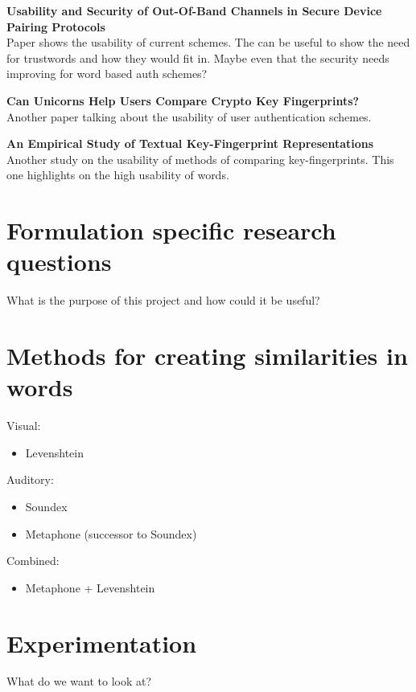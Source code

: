 \textbf{Usability and Security of Out-Of-Band Channels in Secure Device Pairing Protocols}\\
Paper shows the usability of current schemes. The can be useful to show the need for trustwords and how they would fit in. Maybe even that the security needs improving for word based auth schemes?

\textbf{Can Unicorns Help Users Compare Crypto Key Fingerprints?}\\
Another paper talking about the usability of user authentication schemes.

\textbf{An Empirical Study of Textual Key-Fingerprint Representations}\\
Another study on the usability of methods of comparing key-fingerprints. This one highlights on the high usability of words.

\section{Formulation specific research questions}
What is the purpose of this project and how could it be useful?

\section{Methods for creating similarities in words}

Visual: 
\begin{itemize}
    \item Levenshtein 
\end{itemize}

Auditory:
\begin{itemize}
    \item Soundex
    \item Metaphone (successor to Soundex)
\end{itemize}

Combined:
\begin{itemize}
    \item Metaphone + Levenshtein
\end{itemize}

\section{Experimentation}
What do we want to look at?


